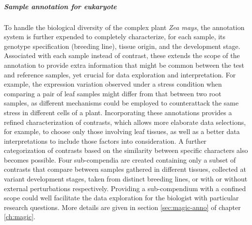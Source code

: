 \subparagraph{Sample annotation for eukaryote}
%
To handle the biological diversity of the complex plant \textit{Zea mays}, the
annotation system is further expended to completely characterize, for each
sample, its genotype specification (breeding line), tissue origin, and the
development stage.
%
Associated with each sample instead of contrast, these extends the scope of the 
annotation to provide extra information that might be common between 
the test and reference samples, yet crucial for data exploration and 
interpretation.
%
For example, the expression variation observed under a stress condition when 
comparing a pair of leaf samples might differ from that between two root 
samples, as different mechanisms could be employed to counterattack the same 
stress in different cells of a plant. 
%
Incorporating these annotations provides a refined characterization of 
contrasts, which allows more elaborate data selections, for example, to choose 
only those involving leaf tissues, as well as a better data interpretations to 
include those factors into consideration.
%
A further categorization of contrasts based on the similarity between specific 
characters also becomes possible.  Four sub-compendia are created containing 
only a subset of contrasts that compare between samples gathered in different 
tissues, collected at variant development stages, taken from distinct breeding 
lines, or with or without external perturbations respectively.
%
Providing a sub-compendium with a confined scope could well facilitate the data 
exploration for the biologist with particular research questions.
%
More details are given in section \ref{sec:magic-anno} of chapter 
\ref{ch:magic}.





